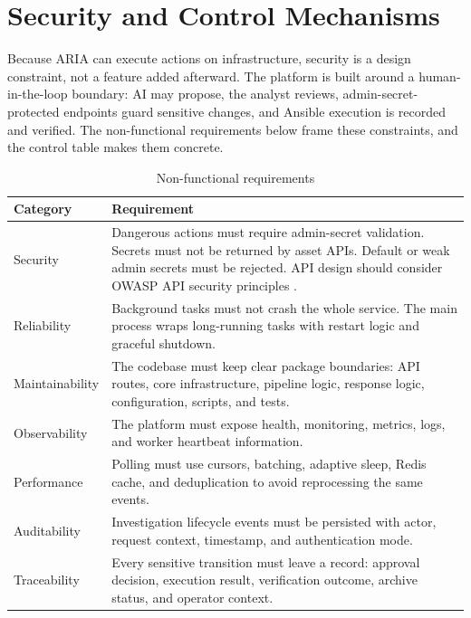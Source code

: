 
\clearpage
{}

\section{Security and Control Mechanisms}

Because ARIA can execute actions on infrastructure, security is a design constraint, not a feature added afterward. The platform is built around a human-in-the-loop boundary: AI may propose, the analyst reviews, admin-secret-protected endpoints guard sensitive changes, and Ansible execution is recorded and verified. The non-functional requirements below frame these constraints, and the control table makes them concrete.

\begin{table}[H]
\centering
\caption{Non-functional requirements}
\begin{tabularx}{\textwidth}{@{}p{}Y@{}}
\toprule
\textbf{Category} & \textbf{Requirement} \\
\midrule
Security & Dangerous actions must require admin-secret validation. Secrets must not be returned by asset APIs. Default or weak admin secrets must be rejected. API design should consider OWASP API security principles \cite{owasp_api}. \\
Reliability & Background tasks must not crash the whole service. The main process wraps long-running tasks with restart logic and graceful shutdown. \\
Maintainability & The codebase must keep clear package boundaries: API routes, core infrastructure, pipeline logic, response logic, configuration, scripts, and tests. \\
Observability & The platform must expose health, monitoring, metrics, logs, and worker heartbeat information. \\
Performance & Polling must use cursors, batching, adaptive sleep, Redis cache, and deduplication to avoid reprocessing the same events. \\
Auditability & Investigation lifecycle events must be persisted with actor, request context, timestamp, and authentication mode. \\
Traceability & Every sensitive transition must leave a record: approval decision, execution result, verification outcome, archive status, and operator context. \\
\bottomrule
\end{tabularx}
\end{table}

